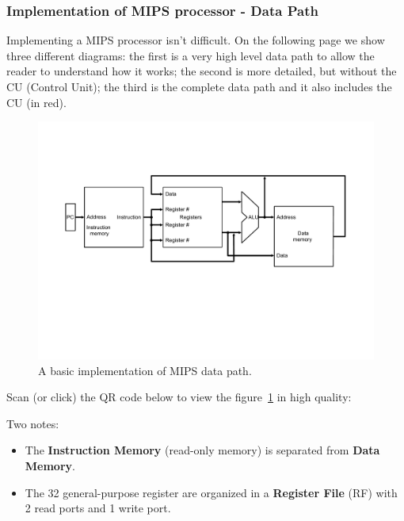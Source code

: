 \documentclass[a4paper]{article}
\begin{document}
    \newpage

    \subsubsection{Implementation of MIPS processor - Data Path}

    Implementing a MIPS processor isn't difficult. On the following page we show three different diagrams: the first is a very high level data path to allow the reader to understand how it works; the second is more detailed, but without the CU (Control Unit); the third is the complete data path and it also includes the CU (in red).

    \begin{figure}[!htp]
        \centering
        \includegraphics[width=\textwidth]{img/basic-implementation-mips-datapath.pdf}
        \caption{A basic implementation of MIPS data path.\cite{pipelining-slides}}
        \label{fig: basic implementation of MIPS data path}
    \end{figure}

    \noindent
    Scan (or click) the QR code below to view the figure~\ref{fig: basic implementation of MIPS data path} in high quality:
    \begin{center}
    \end{center}
    Two notes:
    \begin{itemize}
        \item The \textbf{Instruction Memory} (read-only memory) is separated from \textbf{Data Memory}.
        
        \item The 32 general-purpose register are organized in a \textbf{Register File} (RF) with 2 read ports and 1 write port.
    \end{itemize}
\end{document}
